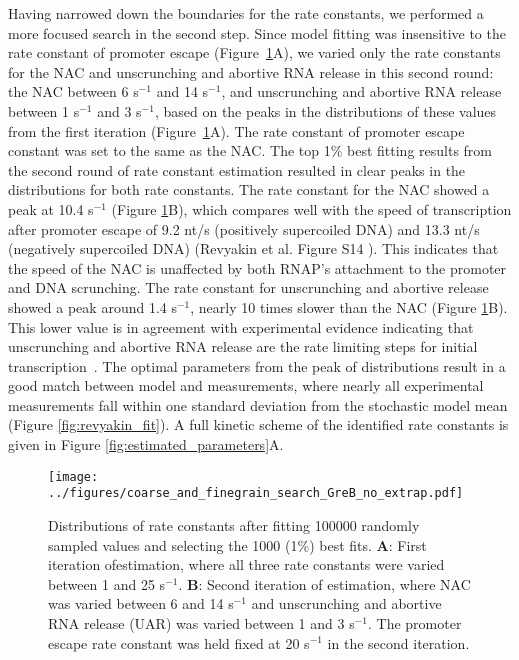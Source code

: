 Having narrowed down the boundaries for the rate constants, we performed a
more focused search in the second step. Since model fitting was insensitive to
the rate constant of promoter escape
(Figure~\ref{fig:parameter_estimation_proper}A), we varied only the rate
constants for the NAC and unscrunching and abortive RNA release in this second
round: the NAC between 6 s$^{-1}$ and 14 s$^{-1}$, and unscrunching and
abortive RNA release between 1 s$^{-1}$ and 3 s$^{-1}$, based on the peaks in
the distributions of these values from the first iteration
(Figure~\ref{fig:parameter_estimation_proper}A). The rate constant of promoter
escape constant was set to the same as the NAC. The top 1\% best fitting
results from the second round of rate constant estimation resulted in clear
peaks in the distributions for both rate constants. The rate constant for the
NAC showed a peak at 10.4 s$^{-1}$ (Figure
\ref{fig:parameter_estimation_proper}B), which compares well with the speed of
transcription after promoter escape of 9.2 nt/s (positively supercoiled DNA)
and 13.3 nt/s (negatively supercoiled DNA) (Revyakin et al.  Figure S14
\cite{revyakin_abortive_2006}). This indicates that the speed of the NAC is
unaffected by both RNAP's attachment to the promoter and DNA scrunching. The
rate constant for unscrunching and abortive release showed a peak around 1.4
s$^{-1}$, nearly 10 times slower than the NAC (Figure
\ref{fig:parameter_estimation_proper}B). This lower value is in agreement with
experimental evidence indicating that unscrunching and abortive RNA release
are the rate limiting steps for initial
transcription~\cite{revyakin_abortive_2006, margeat_direct_2006}. The optimal
parameters from the peak of distributions result in a good match between model
and measurements, where nearly all experimental measurements fall within one
standard deviation from the stochastic model mean (Figure
\ref{fig:revyakin_fit}). A full kinetic scheme of the identified rate
constants is given in Figure \ref{fig:estimated_parameters}A.

\begin{figure}
	\begin{center}
      \texttt{[image: ../figures/coarse\_and\_finegrain\_search\_GreB\_no\_extrap.pdf]}
	\end{center}
    \caption{Distributions of rate constants after fitting 100000 randomly
      sampled values and selecting the 1000 (1\%) best fits. \textbf{A}: First
      iteration ofestimation, where all three rate constants were varied between 1 and
      25 s$^{-1}$. \textbf{B}: Second iteration of estimation, where NAC was varied
      between 6 and 14 s$^{-1}$ and unscrunching and abortive RNA release
      (UAR) was varied between 1 and 3 s$^{-1}$. The promoter escape rate
      constant was held fixed at 20 s$^{-1}$ in the second iteration.}
      \label{fig:parameter_estimation_proper}
\end{figure}

